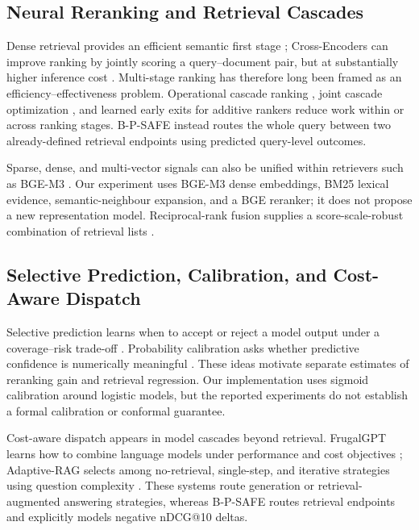 \documentclass[10pt,journal]{IEEEtran}
\makeatletter
\newcommand{\bpsafe}{B-P-SAFE}
\newcommand{\ndcg}{nDCG@10}
\makeatother
\begin{document}
\subsection{Neural Reranking and Retrieval Cascades}

Dense retrieval provides an efficient semantic first stage \cite{karpukhin2020dense}; Cross-Encoders can improve ranking by jointly scoring a query--document pair, but at substantially higher inference cost \cite{nogueira2019passage}. Multi-stage ranking has therefore long been framed as an efficiency--effectiveness problem. Operational cascade ranking \cite{liu2017cascade}, joint cascade optimization \cite{gallagher2019joint}, and learned early exits for additive rankers \cite{busolin2021early} reduce work within or across ranking stages. \bpsafe{} instead routes the whole query between two already-defined retrieval endpoints using predicted query-level outcomes.

Sparse, dense, and multi-vector signals can also be unified within retrievers such as BGE-M3 \cite{chen2024bgem3}. Our experiment uses BGE-M3 dense embeddings, BM25 lexical evidence, semantic-neighbour expansion, and a BGE reranker; it does not propose a new representation model. Reciprocal-rank fusion supplies a score-scale-robust combination of retrieval lists \cite{cormack2009rrf}.

\subsection{Selective Prediction, Calibration, and Cost-Aware Dispatch}

Selective prediction learns when to accept or reject a model output under a coverage--risk trade-off \cite{geifman2019selectivenet}. Probability calibration asks whether predictive confidence is numerically meaningful \cite{guo2017calibration}. These ideas motivate separate estimates of reranking gain and retrieval regression. Our implementation uses sigmoid calibration around logistic models, but the reported experiments do not establish a formal calibration or conformal guarantee.

Cost-aware dispatch appears in model cascades beyond retrieval. FrugalGPT learns how to combine language models under performance and cost objectives \cite{chen2023frugalgpt}; Adaptive-RAG selects among no-retrieval, single-step, and iterative strategies using question complexity \cite{jeong2024adaptiverag}. These systems route generation or retrieval-augmented answering strategies, whereas \bpsafe{} routes retrieval endpoints and explicitly models negative \ndcg{} deltas.
\end{document}

